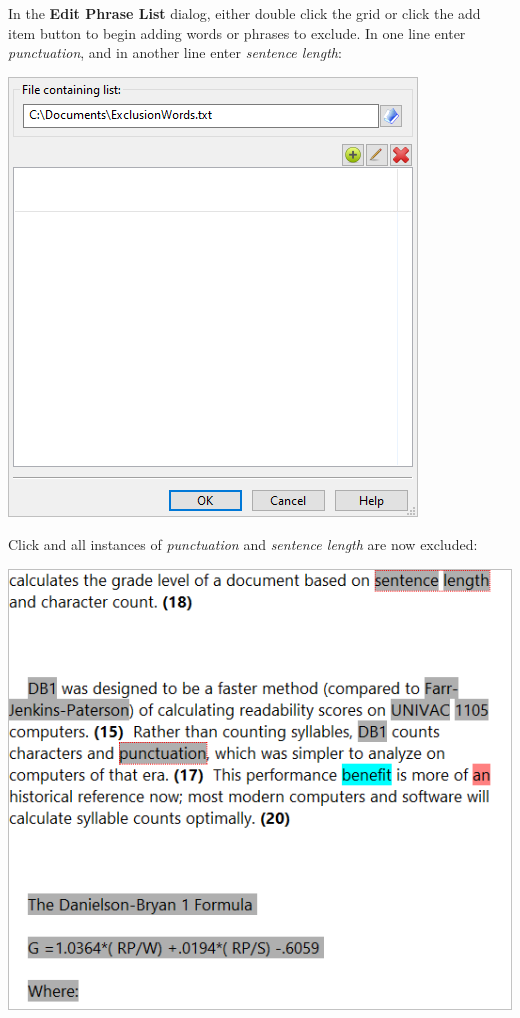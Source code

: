 \documentclass[
]{book}
\theoremstyle{definition}
\theoremstyle{definition}
\theoremstyle{definition}
\theoremstyle{definition}
\theoremstyle{remark}
\begin{document}
In the \textbf{Edit Phrase List} dialog, either double click the grid or click the add item button to begin adding words or phrases to exclude. In one line enter \emph{punctuation}, and in another line enter \emph{sentence length}:

\includegraphics{Images/ExclusionExampleCustomWords.png}

Click  and all instances of \emph{punctuation} and \emph{sentence length} are now excluded:

\includegraphics{Images/ExclusionExampleCustomWordsExcludedNow.png}
\end{document}

